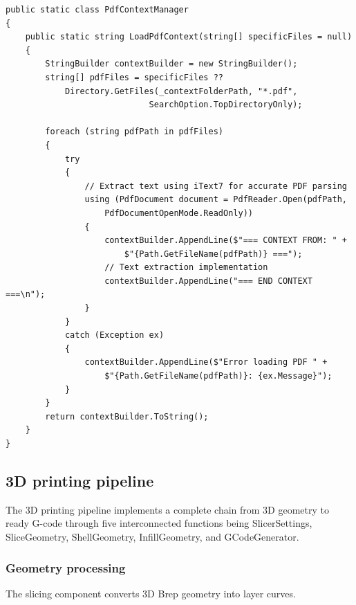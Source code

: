 \begin{verbatim}
public static class PdfContextManager
{
    public static string LoadPdfContext(string[] specificFiles = null)
    {
        StringBuilder contextBuilder = new StringBuilder();
        string[] pdfFiles = specificFiles ?? 
            Directory.GetFiles(_contextFolderPath, "*.pdf", 
                             SearchOption.TopDirectoryOnly);

        foreach (string pdfPath in pdfFiles)
        {
            try
            {
                // Extract text using iText7 for accurate PDF parsing
                using (PdfDocument document = PdfReader.Open(pdfPath, 
                    PdfDocumentOpenMode.ReadOnly))
                {
                    contextBuilder.AppendLine($"=== CONTEXT FROM: " +
                        $"{Path.GetFileName(pdfPath)} ===");
                    // Text extraction implementation
                    contextBuilder.AppendLine("=== END CONTEXT ===\n");
                }
            }
            catch (Exception ex)
            {
                contextBuilder.AppendLine($"Error loading PDF " +
                    $"{Path.GetFileName(pdfPath)}: {ex.Message}");
            }
        }
        return contextBuilder.ToString();
    }
}
\end{verbatim}

\subsection{3D printing pipeline}

The 3D printing pipeline implements a complete chain from 3D geometry to ready G-code through five interconnected functions being SlicerSettings, SliceGeometry, ShellGeometry, InfillGeometry, and GCodeGenerator.

\subsubsection{Geometry processing}

The slicing component converts 3D Brep geometry into layer curves.

